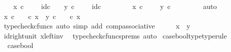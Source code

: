 \begin{isabellebody}
\ \ \isamarkupfalse%
\ {\isachardoublequoteopen}x\ {\isasymcirc}\isactrlsub c\ {\isasymt}\ {\isasymamalg}\ {\isasymf}\ {\isacharequal}{\kern0pt}\ id\isactrlsub c\ {\isacharparenleft}{\kern0pt}{\isasymone}\ {\isasymCoprod}\ {\isasymone}{\isacharparenright}{\kern0pt}{\isachardoublequoteclose}\ {\isachardoublequoteopen}y\ {\isasymcirc}\isactrlsub c\ {\isasymt}\ {\isasymamalg}\ {\isasymf}\ {\isacharequal}{\kern0pt}\ id\isactrlsub c\ {\isacharparenleft}{\kern0pt}{\isasymone}\ {\isasymCoprod}\ {\isasymone}{\isacharparenright}{\kern0pt}{\isachardoublequoteclose}\isanewline
\ \ \isamarkupfalse%
\ \isamarkupfalse%
\ {\isachardoublequoteopen}x\ {\isasymcirc}\isactrlsub c\ {\isasymt}\ {\isasymamalg}\ {\isasymf}\ {\isacharequal}{\kern0pt}\ y\ {\isasymcirc}\isactrlsub c\ {\isasymt}\ {\isasymamalg}\ {\isasymf}{\isachardoublequoteclose}\isanewline
\ \ \ \ \isamarkupfalse%
\ auto\isanewline
\ \ \isamarkupfalse%
\ \isamarkupfalse%
\ {\isachardoublequoteopen}x\ {\isasymcirc}\isactrlsub c\ {\isasymt}\ {\isasymamalg}\ {\isasymf}\ {\isasymcirc}\isactrlsub c\ x\ {\isacharequal}{\kern0pt}\ y\ {\isasymcirc}\isactrlsub c\ {\isasymt}\ {\isasymamalg}\ {\isasymf}\ {\isasymcirc}\isactrlsub c\ x{\isachardoublequoteclose}\isanewline
\ \ \ \ \isamarkupfalse%
\ {\isacharparenleft}{\kern0pt}typecheck{\isacharunderscore}{\kern0pt}cfuncs{\isacharcomma}{\kern0pt}\ auto\ simp\ add{\isacharcolon}{\kern0pt}\ comp{\isacharunderscore}{\kern0pt}associative{}{\isacharparenright}{\kern0pt}\isanewline
\ \ \isamarkupfalse%
\ \isamarkupfalse%
\ {\isachardoublequoteopen}x\ {\isacharequal}{\kern0pt}\ y{\isachardoublequoteclose}\isanewline
\ \ \ \ \isamarkupfalse%
\ id{\isacharunderscore}{\kern0pt}right{\isacharunderscore}{\kern0pt}unit{}\ x{\isacharunderscore}{\kern0pt}left{\isacharunderscore}{\kern0pt}inv\ \isamarkupfalse%
\ {\isacharparenleft}{\kern0pt}typecheck{\isacharunderscore}{\kern0pt}cfuncs{\isacharunderscore}{\kern0pt}prems{\isacharcomma}{\kern0pt}\ auto{\isacharparenright}{\kern0pt}\isanewline
{}\isamarkupfalse%
%
\endisatagproof
{\isafoldproof}%
%
\isadelimproof
\isanewline
%
\endisadelimproof
\isanewline
{}\isamarkupfalse%
\ case{\isacharunderscore}{\kern0pt}bool{\isacharunderscore}{\kern0pt}type{\isacharbrackleft}{\kern0pt}type{\isacharunderscore}{\kern0pt}rule{\isacharbrackright}{\kern0pt}{\isacharcolon}{\kern0pt}\ \isanewline
\ \ {\isachardoublequoteopen}case{\isacharunderscore}{\kern0pt}bool\ {\isacharcolon}{\kern0pt}\ {\isasymOmega}\ {\isasymrightarrow}\ {\isasymone}\ {\isasymCoprod}\ {\isasymone}{\isachardoublequoteclose}\isanewline

\end{isabellebody}
